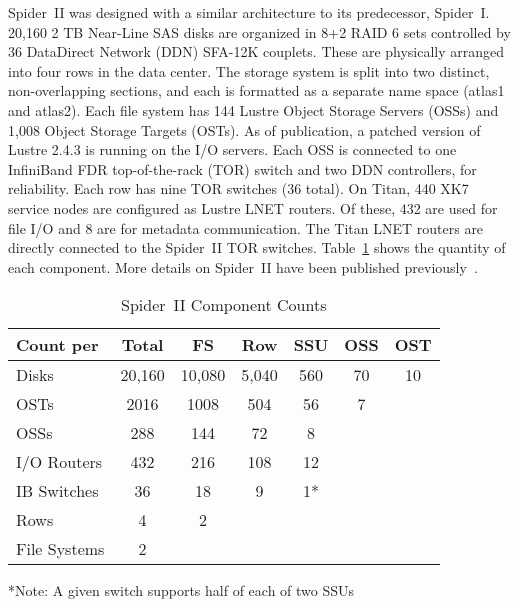 Spider~II was designed with a similar architecture to its predecessor,
Spider~I.  20,160 2 TB Near-Line SAS disks are organized in 8+2 RAID 6 sets
controlled by 36 DataDirect Network (DDN) SFA-12K couplets. These are
physically arranged into four rows in the data center.  The storage system is
split into two distinct, non-overlapping sections, and each is formatted as a
separate name space (atlas1 and atlas2). Each file system has 144 Lustre Object
Storage Servers (OSSs) and 1,008 Object Storage Targets (OSTs). As of
publication, a patched version of Lustre 2.4.3 is running on the I/O servers.
Each OSS is connected to one InfiniBand FDR top-of-the-rack (TOR) switch and
two DDN controllers, for reliability.  Each row has nine TOR switches (36
total).  On Titan, 440 XK7 service nodes are configured as Lustre LNET routers.
Of these, 432 are used for file I/O and 8 are for metadata communication.  The
Titan LNET routers are directly connected to the Spider~II TOR switches.
Table~\ref{table:component-counts} shows the quantity of each component.  More
details on Spider~II have been published previously~\cite{atlas}.

\begin{table}
 \caption{Spider~II Component Counts}
 \label{table:component-counts}
 \begin{tabular}{ | l | c | c | c | c | c | c | }
  \hline
  Count per	& Total		& FS		& Row	& SSU	& OSS	& OST	\\ \hline
  Disks		& 20,160	& 10,080	& 5,040	& 560	& 70	& 10	\\ \hline
  OSTs		& 2016		& 1008		& 504	& 56	& 7	&	\\ \hline
  OSSs		& 288		& 144		& 72	& 8	&	&	\\ \hline
  I/O Routers	& 432		& 216		& 108	& 12	&	&	\\ \hline
  IB Switches	& 36		& 18		& 9	& 1*	&	&	\\ \hline
  Rows		& 4		& 2		&	&	&	&	\\ \hline
  File Systems	& 2		&		&	&	&	&	\\ \hline
 \end{tabular}
 *Note: A given switch supports half of each of two SSUs
\end{table}

